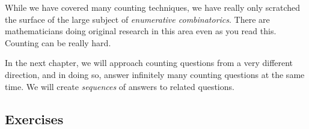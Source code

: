 \documentclass[10pt,]{book}
\theoremstyle{plain}
\theoremstyle{definition}
\theoremstyle{definition}
\theoremstyle{definition}
\numberwithin{equation}{section}
\begin{document}
      While we have covered many counting techniques, we have really only scratched the surface of the large subject of \emph{enumerative combinatorics}. There are mathematicians doing original research in this area even as you read this. Counting can be really hard.
\par

      In the next chapter, we will approach counting questions from a very different direction, and in doing so, answer infinitely many counting questions at the same time. We will create \emph{sequences} of answers to related questions.
\typeout{************************************************}
\typeout{************************************************}
\subsection[Exercises]{Exercises}\label{exercises-10}
\end{document}

